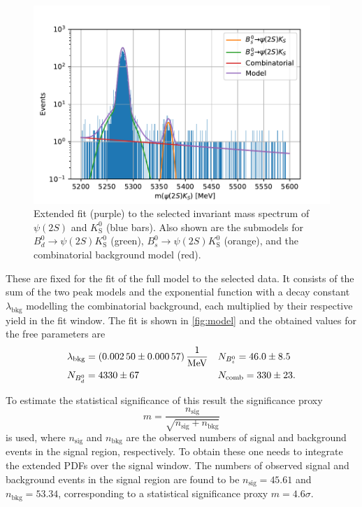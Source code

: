 \begin{figure}[tb]
  \centering
  \includegraphics[width=12cm]{plots/data_fit_extended.pdf}
  \caption{Extended fit (purple) to the selected invariant mass spectrum of $\psi(2S)$ and $K^0_\mathrm{S}$ (blue bars). Also shown are the submodels for $B^0_d \to \psi(2S)K^0_\mathrm{S}$ (green), $B^0_s \to \psi(2S)K^0_\mathrm{S}$ (orange), and the combinatorial background model (red).}
  \label{fig:model}
\end{figure}

These are fixed for the fit of the full model to the selected data. It consists of the sum of the two peak models and the exponential function with a decay constant $\lambda_\mathrm{bkg}$ modelling the combinatorial background, each multiplied by their respective yield in the fit window. The fit is shown in \autoref{fig:model} and the obtained values for the free parameters are
\begin{align*}
  &\lambda_\mathrm{bkg} = \SI{0.0025 \pm 0.00057}{\per\mega\eV} && N_{B^0_s} = \num{46 \pm 8.5}\\
  &N_{B^0_d} = \num{4330 \pm 67} && N_\mathrm{comb} = \num{330 \pm 23}.
\end{align*}

To estimate the statistical significance of this result the significance proxy
\begin{equation*}
  m = \frac{n_\mathrm{sig}}{\sqrt{n_\mathrm{sig} + n_\mathrm{bkg}}}
\end{equation*}
is used, where $n_\mathrm{sig}$ and $n_\mathrm{bkg}$ are the observed numbers of signal and background events in the signal region, respectively. To obtain these one needs to integrate the extended PDFs over the signal window.
The numbers of observed signal and background events in the signal region are found to be $n_\mathrm{sig} = \num{45.61}$ and $n_\mathrm{bkg} = \num{53.34}$, corresponding to a statistical significance proxy $m =\num{4.6}\sigma$.
